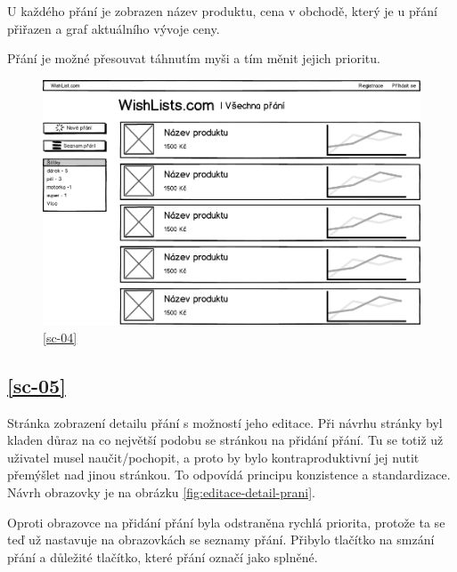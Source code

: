 U každého přání je zobrazen název produktu, cena v obchodě, který je u přání přiřazen a graf aktuálního vývoje ceny.

Přání je možné přesouvat táhnutím myši a tím měnit jejich prioritu.

\begin{figure}[htb]
\begin{center}
\includegraphics[width=130mm]{./pictures/mock/vsechna-prani.png}
\caption{\ref{sc-04}}
\label{fig:vsechna-prani}
\end{center}
\end{figure}

\subsection{\ref{sc-05}}
Stránka zobrazení detailu přání s možností jeho editace. Při návrhu stránky byl kladen důraz na co největší podobu se stránkou na přidání přání. Tu se totiž už uživatel musel naučit/pochopit, a proto by bylo kontraproduktivní jej nutit přemýšlet nad jinou stránkou. To odpovídá principu konzistence a standardizace\cite{molich1990improving}. Návrh obrazovky je na obrázku \ref{fig:editace-detail-prani}.

Oproti obrazovce na přidání přání byla odstraněna rychlá priorita, protože ta se teď už nastavuje na obrazovkách se seznamy přání. Přibylo tlačítko na smzání přání a důležité tlačítko, které přání označí jako splněné.


